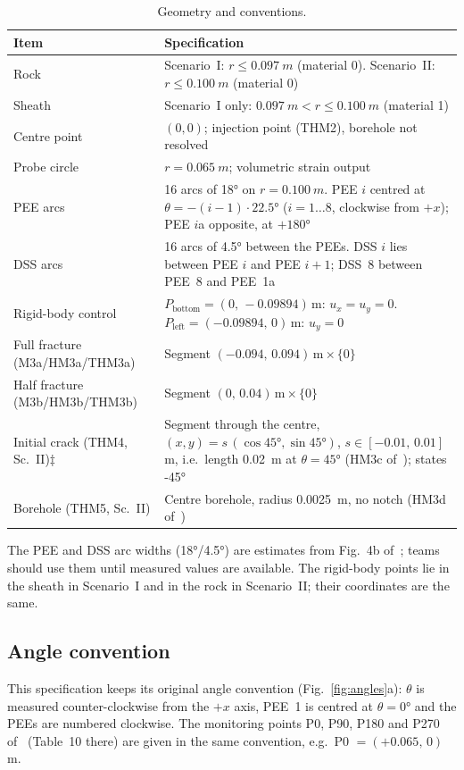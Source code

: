 \documentclass[11pt,a4paper]{article}
\newcommand{\incons}{\textcolor{red!70!black}{$\ddagger$}}
\begin{document}
\begin{table}[htbp]
\centering
\caption{Geometry and conventions.}
\label{tab:geometry}
\begin{tabularx}{\textwidth}{@{}lL@{}}
\toprule
Item & Specification \\
\midrule
Rock               & Scenario~I: $r \le \SI{0.097}{m}$ (material 0). Scenario~II: $r \le \SI{0.100}{m}$ (material 0) \\
Sheath             & Scenario~I only: $\SI{0.097}{m} < r \le \SI{0.100}{m}$ (material 1) \\
Centre point       & $(0,0)$; injection point (THM2), borehole not resolved \\
Probe circle       & $r=\SI{0.065}{m}$; volumetric strain output \\
PEE arcs           & 16 arcs of \ang{18} on $r=\SI{0.100}{m}$. PEE $i$ centred at $\theta=-(i-1)\cdot\ang{22.5}$ ($i=1\ldots8$, clockwise from $+x$); PEE $i$a opposite, at $+\ang{180}$ \\
DSS arcs           & 16 arcs of \ang{4.5} between the PEEs. DSS $i$ lies between PEE $i$ and PEE $i+1$; DSS~8 between PEE~8 and PEE~1a \\
Rigid-body control & $P_\mathrm{bottom}=(0,\,-0.09894)$\,m: $u_x=u_y=0$. $P_\mathrm{left}=(-0.09894,\,0)$\,m: $u_y=0$ \\
Full fracture (M3a/HM3a/THM3a) & Segment $(-0.094,\,0.094)\,\mathrm{m}\times\{0\}$ \\
Half fracture (M3b/HM3b/THM3b) & Segment $(0,\,0.04)\,\mathrm{m}\times\{0\}$ \\
Initial crack (THM4, Sc.~II)\incons & Segment through the centre, $(x,y)=s\,(\cos\ang{45},\sin\ang{45})$, $s\in[-0.01,\,0.01]$\,m, i.e.\ length \SI{0.02}{m} at $\theta=\ang{45}$ (HM3c of~\cite{Mollaali2026}); \cite{Pan2026} states \ang{-45} \\
Borehole (THM5, Sc.~II) & Centre borehole, radius \SI{0.0025}{m}, no notch (HM3d of~\cite{Mollaali2026}) \\
\bottomrule
\end{tabularx}
\end{table}

The PEE and DSS arc widths (\ang{18}/\ang{4.5}) are estimates from Fig.~4b
of~\cite{Mollaali2026}; teams should use them until measured values are
available. The rigid-body points lie in the sheath in Scenario~I and in the rock
in Scenario~II; their coordinates are the same.

\subsection{Angle convention}
\label{sec:angles}
This specification keeps its original angle convention (Fig.~\ref{fig:angles}a):
$\theta$ is measured counter-clockwise from the $+x$ axis, PEE~1 is centred at
$\theta=\ang{0}$ and the PEEs are numbered clockwise. The monitoring points
P0, P90, P180 and P270 of~\cite{Pan2026} (Table~10 there) are given in the same
convention, e.g.\ P0 $=(+0.065,\,0)$\,m.
\end{document}
